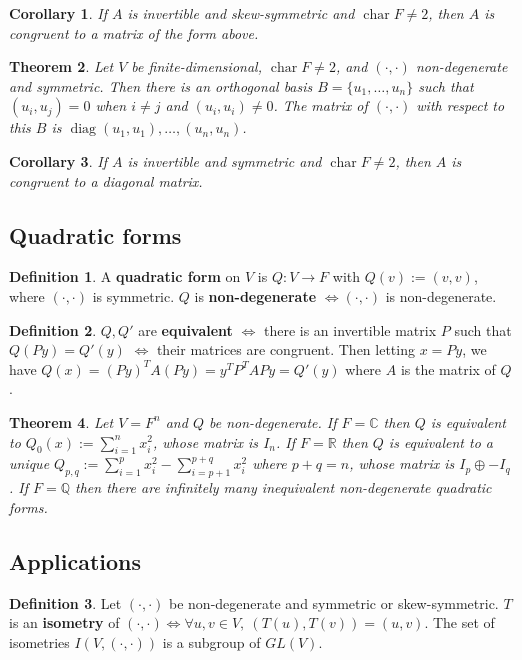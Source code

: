 \documentclass[12pt]{article}
\newtheorem{thm}{Theorem}[section]
\newtheorem{cor}[thm]{Corollary}
\theoremstyle{definition}
\newtheorem*{defn*}{Definition}
\DeclareMathOperator{\chr}{char}
\DeclareMathOperator{\diag}{diag}
\begin{document}
\begin{cor}
	If $A$ is invertible and skew-symmetric and $\chr{F} \neq 2$, then $A$ is congruent to a matrix of the form above.
\end{cor}

\begin{thm}
	Let $V$ be finite-dimensional, $\chr{F} \neq 2$, and $(\cdot,\cdot)$ non-degenerate and symmetric.
	Then there is an orthogonal basis $B = \{u_1, \ldots, u_n\}$ such that $(u_i, u_j) = 0$ when $i \neq j$ and $(u_i, u_i) \neq 0$.
	The matrix of $(\cdot, \cdot)$ with respect to this $B$ is $\diag{(u_1, u_1), \ldots, (u_n, u_n)}$.
\end{thm}

\begin{cor}
	If $A$ is invertible and symmetric and $\chr{F} \neq 2$, then $A$ is congruent to a diagonal matrix.
\end{cor}

\subsection{Quadratic forms}

\begin{defn*}
	A \textbf{quadratic form} on $V$ is $Q : V \to F$ with $Q(v) := (v, v)$, where $(\cdot, \cdot)$ is symmetric.
	$Q$ is \textbf{non-degenerate} $\iff (\cdot, \cdot)$ is non-degenerate.
\end{defn*}

\begin{defn*}
	$Q, Q'$ are \textbf{equivalent} $\iff$ there is an invertible matrix $P$ such that $Q(Py) = Q'(y)$ $\iff$ their matrices are congruent.
	Then letting $x = Py$, we have $Q(x) = (Py)^TA(Py) = y^TP^TAPy = Q'(y)$ where $A$ is the matrix of $Q$.
\end{defn*}

\begin{thm}
	Let $V = F^n$ and $Q$ be non-degenerate.
	If $F = \mathbb{C}$ then $Q$ is equivalent to $Q_0(x) := \sum_{i = 1}^nx_i^2$, whose matrix is $I_n$.
	If $F = \mathbb{R}$ then $Q$ is equivalent to a unique $Q_{p,q} := \sum_{i = 1}^px_i^2 - \sum_{i = p + 1}^{p + q}x_i^2$ where $p + q = n$, whose matrix is $I_p \oplus -I_q$.
	If $F = \mathbb{Q}$ then there are infinitely many inequivalent non-degenerate quadratic forms.
\end{thm}

\subsection{Applications}

\begin{defn*}
	Let $(\cdot, \cdot)$ be non-degenerate and symmetric or skew-symmetric.
	$T$ is an \textbf{isometry} of $(\cdot, \cdot) \iff \forall u, v \in V,\ (T(u), T(v)) = (u, v)$.
	The set of isometries $I(V, (\cdot, \cdot))$ is a subgroup of $GL(V)$.
\end{defn*}
\end{document}
